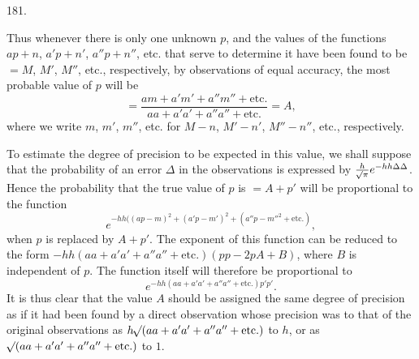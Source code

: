 \begin{center}\hypertarget{native-254-article181}{}181.\end{center}
Thus whenever there is only one unknown $p$, and the values of the functions $ap+n$, $a'p+n'$, $a''p+n''$, etc. that serve to determine it have been found to be $=M$, $M'$, $M''$, etc., respectively, by observations of equal accuracy, the most probable value of $p$ will be
\[
=\frac{am+a'm'+a''m''+\text{etc.}}{aa+a'a'+a''a''+\text{etc.}}=A,
\]
where we write $m$, $m'$, $m''$, etc. for $M-n$, $M'-n'$, $M''-n''$, etc., respectively.

To estimate the degree of precision to be expected in this value, we shall suppose that the probability of an error $\Delta$ in the observations is expressed by $\frac{h}{\mathord{{}^{}\!\surd}\pi}e^{-hh\Delta\Delta}$. Hence the probability that the true value of $p$ is $=A+p'$ will be proportional to the function
\[
e^{-hh((ap-m)^2+(a'p-m')^2+(a''p-m''^2+\text{etc.})},
\]
when $p$ is replaced by $A+p'$. The exponent of this function can be reduced to the form $-hh(aa+a'a'+a''a''+\text{etc.})(pp-2pA+B)$, where $B$ is independent of $p$. The function itself will therefore be proportional to
\[
e^{-hh(aa+a'a'+a''a''+\text{etc.})p'p'}.
\]
It is thus clear that the value $A$ should be assigned the same degree of precision as if it had been found by a direct observation whose precision was to that of the original observations as $h\mathord{{}^{}\!\surd}(aa+a'a'+a''a''+\text{etc.})$ to $h$, or as $\mathord{{}^{}\!\surd}(aa+a'a'+a''a''+\text{etc.})$ to $1$.
